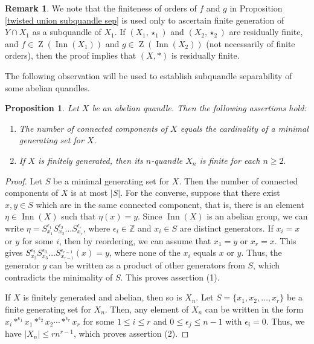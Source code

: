 \documentclass[12pt]{amsart}
\newtheorem{prop}[theorem]{Proposition}
\theoremstyle{definition}
\newtheorem{remark}[theorem]{Remark}
\numberwithin{equation}{subsection}
\newcommand{\Inn}{\operatorname{Inn}}
\newcommand{\Z}{\operatorname{Z}}
\begin{document}
\begin{remark}
We note that the finiteness of orders of $f$ and $g$ in Proposition \ref{twisted union subquandle sep} is used only to ascertain finite generation of $Y \cap X_1$ as a subquandle of $X_1$. If $(X_1,\star_1)$ and $(X_2,\star_2)$ are residually finite, and  $f\in \Z(\Inn(X_1))$ and $g\in \Z(\Inn(X_2))$ (not necessarily of finite orders), then the proof implies that $(X,\ast)$ is residually finite.
\end{remark}

The following observation will be used to establish subquandle separability of some abelian quandles.

\begin{prop}\label{n-abelian finite}
Let $X$ be an abelian quandle. Then the following assertions hold:
\begin{enumerate}
\item The number of connected components of $X$ equals the cardinality of a minimal generating set for $X$.
\item If $X$ is finitely generated, then its $n$-quandle $X_n$ is finite for each $n \geq 2.$
\end{enumerate}
\end{prop}
\begin{proof}
Let $S$ be a minimal generating set for $X$. Then the number of connected components of $X$ is at most $| S|$. For the converse, suppose that there exist $x,y\in S$ which are in the same connected component, that is, there is an element $\eta\in \Inn(X)$ such that $\eta(x)=y$. Since $ \Inn(X)$ is an abelian group, we can write $\eta=S_{x_1}^{\epsilon_1}S_{x_2}^{\epsilon_2}\dots S_{x_r}^{\epsilon_r}$, where $\epsilon_i\in \mathbb{Z}$ and $x_i\in S$ are distinct generators. If $x_i=x$ or $y$ for some $i$, then by reordering, we can assume that $x_1=y$ or $x_r=x$. This gives $S_{x_2}^{\epsilon_2}S_{x_3}^{\epsilon_3}\dots S_{x_{r-1}}^{\epsilon_{r-1}}(x)=y$, where none of the $x_i$ equals $x$ or $y$. Thus, the generator $y$ can be written as a product of other generators from $S$, which contradicts the minimality of $S$. This proves assertion (1).
\par
If $X$ is finitely generated and abelian, then so is $X_n$. Let $S=\{x_1,x_2,\dots,x_r\}$ be a finite generating set for $X_n$. Then, any element of $X_n$ can be written in the form $x_i\ast^{\epsilon_1}x_1\ast^{\epsilon_2}x_2\cdots\ast^{\epsilon_r}x_r$ for some $1 \le i \le r$ and  $0 \le \epsilon_j \le n-1$ with $\epsilon_i=0$. Thus, we have $|X_n|\leq rn^{r-1}$, which proves assertion (2).
\end{proof}
\end{document}
